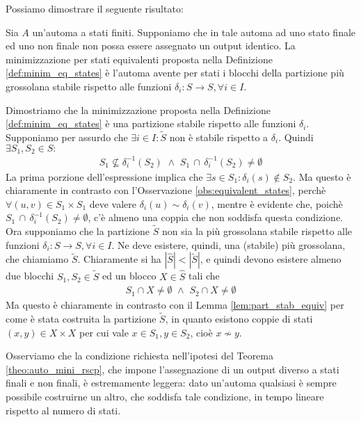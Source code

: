 Possiamo dimostrare il seguente risultato:
\begin{theorem}
    \label{theo:auto_mini_rscp}
    Sia $A$ un'automa a stati finiti. Supponiamo che in tale automa ad uno stato finale ed uno non finale non possa essere assegnato un output identico. La minimizzazione per stati equivalenti proposta nella Definizione \ref{def:minim_eq_states} è l'automa avente per stati i blocchi della partizione più grossolana stabile rispetto alle funzioni $\delta_i : S \to S, \forall i \in I$.
\end{theorem}
\begin{proof2}
    Dimostriamo che la minimizzazione proposta nella Definizione \ref{def:minim_eq_states} è una partizione stabile rispetto alle funzioni $\delta_i$. Supponiamo per assurdo che $\exists i \in I : \widetilde{S}$ non è stabile rispetto a $\delta_i$. Quindi $\exists S_1, S_2 \in S :$
    \begin{gather*}
        S_1 \not\subseteq \delta_i^{-1}(S_2) \,\, \land \,\, S_1 \,\cap \,\delta_i^{-1}(S_2) \neq \emptyset
    \end{gather*}
    La prima porzione dell'espressione implica che $\exists s \in S_1 : \delta_i(s) \not\in S_2$. Ma questo è chiaramente in contrasto con l'Osservazione \ref{obs:equivalent_states}, perchè $\forall (u,v) \in S_1 \times S_1$ deve valere $\delta_i(u) \sim \delta_i(v)$, mentre è evidente che, poichè $S_1 \,\cap\, \delta_i^{-1}(S_2) \neq \emptyset$, c'è almeno una coppia che non soddisfa questa condizione.\\
    Ora supponiamo che la partizione $\widetilde{S}$ non sia la più grossolana stabile rispetto alle funzioni $\delta_i : S \to S, \forall i \in I$. Ne deve esistere, quindi, una (stabile) più grossolana, che chiamiamo $\widetilde{S}$. Chiaramente si ha $|\widehat{S}| < |\widetilde{S}|$, e quindi devono esistere almeno due blocchi $S_1,S_2 \in \widetilde{S}$ ed un blocco $X \in \widehat{S}$ tali che
    \begin{gather*}
        S_1 \cap X \neq \emptyset \,\,\land\,\, S_2 \cap X \neq \emptyset
    \end{gather*}
    Ma questo è chiaramente in contrasto con il Lemma \ref{lem:part_stab_equiv} per come è stata costruita la partizione $\widetilde{S}$, in quanto esistono coppie di stati $(x,y) \in X \times X$ per cui vale $x \in S_1, y \in S_2$, cioè $x \not\sim y$.
\end{proof2}
Osserviamo che la condizione richiesta nell'ipotesi del Teorema \ref{theo:auto_mini_rscp}, che impone l'assegnazione di un output diverso a stati finali e non finali, è estremamente leggera: dato un'automa qualsiasi è sempre possibile costruirne un altro, che soddisfa tale condizione, in tempo lineare rispetto al numero di stati.

